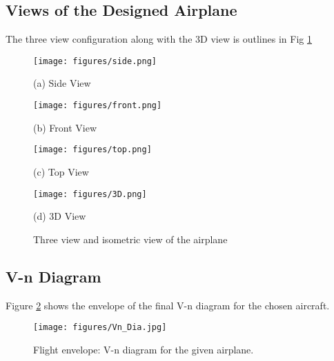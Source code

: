 \documentclass[a4paper,10pt]{article}
\begin{document}
\subsection{Views of the Designed Airplane}
The three view configuration along with the 3D view is outlines in Fig \ref{fig:3view}
\begin{figure}[H]
\centering
\begin{minipage}{0.5\textwidth}
\begin{centering}
\texttt{[image: figures/side.png]}
\centerline{\small (a) Side View}
\end{centering}
\end{minipage}
\hspace{2mm}
\begin{minipage}{0.4\textwidth}
\begin{centering}
\texttt{[image: figures/front.png]}
\centerline{\small (b) Front View}
\end{centering}
\end{minipage}
%
\vspace{0.1in}
\begin{minipage}{0.6\textwidth}
\begin{centering}
\texttt{[image: figures/top.png]}
\centerline{\small (c) Top View}
\end{centering}
\end{minipage}
\hspace{2mm}
\begin{minipage}{0.4\textwidth}
\begin{centering}
\texttt{[image: figures/3D.png]}
\centerline{\small (d) 3D View}
\end{centering}
\end{minipage}
\caption{Three view and isometric view of the airplane}
\label{fig:3view}
\end{figure}
%
%
\subsection{V-n Diagram}
Figure \ref{fig:V_n_diag} shows the envelope of the final V-n diagram for the chosen aircraft.
%
\begin{figure}[H]
    \begin{center}
      \texttt{[image: figures/Vn\_Dia.jpg]}
\caption{Flight envelope: V-n diagram for the given airplane.}
       \label{fig:V_n_diag}
    \end{center}
\end{figure}
%
\end{document}
